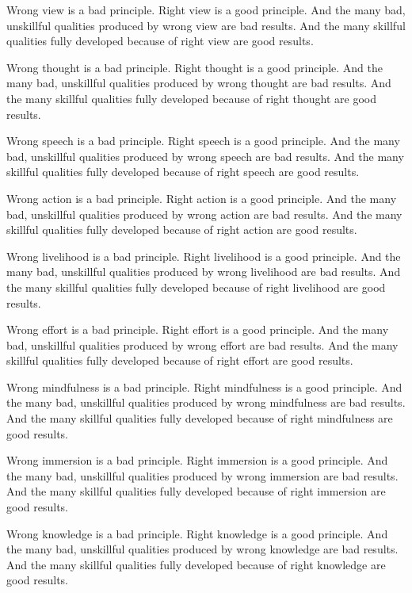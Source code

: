 \documentclass[12pt,openany]{book}%
\begin{document}
Wrong view is a bad principle. Right view is a good principle. And the many bad, unskillful qualities produced by wrong view are bad results. And the many skillful qualities fully developed because of right view are good results. 

Wrong thought is a bad principle. Right thought is a good principle. And the many bad, unskillful qualities produced by wrong thought are bad results. And the many skillful qualities fully developed because of right thought are good results. 

Wrong speech is a bad principle. Right speech is a good principle. And the many bad, unskillful qualities produced by wrong speech are bad results. And the many skillful qualities fully developed because of right speech are good results. 

Wrong action is a bad principle. Right action is a good principle. And the many bad, unskillful qualities produced by wrong action are bad results. And the many skillful qualities fully developed because of right action are good results. 

Wrong livelihood is a bad principle. Right livelihood is a good principle. And the many bad, unskillful qualities produced by wrong livelihood are bad results. And the many skillful qualities fully developed because of right livelihood are good results. 

Wrong effort is a bad principle. Right effort is a good principle. And the many bad, unskillful qualities produced by wrong effort are bad results. And the many skillful qualities fully developed because of right effort are good results. 

Wrong mindfulness is a bad principle. Right mindfulness is a good principle. And the many bad, unskillful qualities produced by wrong mindfulness are bad results. And the many skillful qualities fully developed because of right mindfulness are good results. 

Wrong immersion is a bad principle. Right immersion is a good principle. And the many bad, unskillful qualities produced by wrong immersion are bad results. And the many skillful qualities fully developed because of right immersion are good results. 

Wrong knowledge is a bad principle. Right knowledge is a good principle. And the many bad, unskillful qualities produced by wrong knowledge are bad results. And the many skillful qualities fully developed because of right knowledge are good results. 
\end{document}
